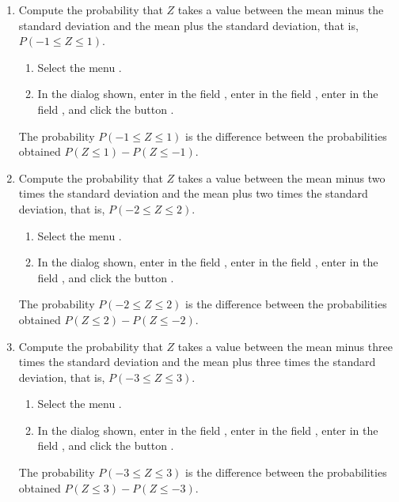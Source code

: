 \begin{enumerate}[leftmargin=*]
\begin{enumerate}
\item Compute the probability that $Z$ takes a value between the mean minus the standard deviation and the mean plus the standard deviation, that is, $P(-1\leq Z\leq 1)$. 
\begin{indication}
\begin{enumerate}
\item Select the menu .
\item In the dialog shown, enter  in the field , enter  in the field , enter  in the field , and click the button .
\end{enumerate}
The probability $P(-1\leq Z\leq 1)$ is the difference between the probabilities obtained \mbox{$P(Z\leq 1)-P(Z\leq -1)$}.
\end{indication}

\item Compute the probability that $Z$ takes a value between the mean minus two times the standard deviation and the mean plus two times the standard deviation, that is, \mbox{$P(-2\leq Z\leq 2)$}. 
\begin{indication}
\begin{enumerate}
\item Select the menu .
\item In the dialog shown, enter  in the field , enter  in the field , enter  in the field , and click the button .
\end{enumerate}
The probability $P(-2\leq Z\leq 2)$ is the difference between the probabilities obtained \mbox{$P(Z\leq 2)-P(Z\leq -2)$}.
\end{indication}

\item Compute the probability that $Z$ takes a value between the mean minus three times the standard deviation and the mean plus three times the standard deviation, that is, \mbox{$P(-3\leq Z\leq 3)$}. 
\begin{indication}
\begin{enumerate}
\item Select the menu .
\item In the dialog shown, enter  in the field , enter  in the field , enter  in the field , and click the button .
\end{enumerate}
The probability $P(-3\leq Z\leq 3)$ is the difference between the probabilities obtained \mbox{$P(Z\leq 3)-P(Z\leq -3)$}.
\end{indication}


\end{enumerate}
\end{enumerate}
